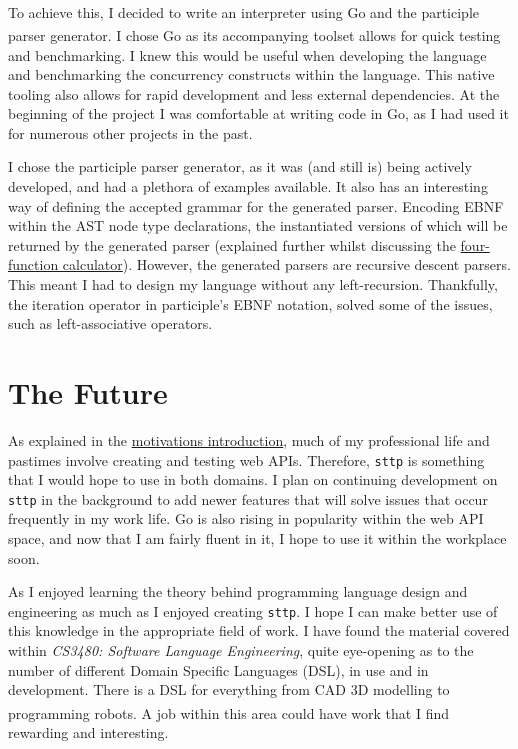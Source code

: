 \documentclass[]{full}
\theoremstyle{definition}
\begin{document}
To achieve this, I decided to write an interpreter using Go\textsuperscript{\cite{the_go_programming_language}} and the participle parser generator\textsuperscript{\cite{thomas_2021}}. I chose Go as its accompanying toolset allows for quick testing and benchmarking. I knew this would be useful when developing the language and benchmarking the concurrency constructs within the language. This native tooling also allows for rapid development and less external dependencies. At the beginning of the project I was comfortable at writing code in Go, as I had used it for numerous other projects in the past.

I chose the participle parser generator, as it was (and still is) being actively developed, and had a plethora of examples available. It also has an interesting way of defining the accepted grammar for the generated parser. Encoding EBNF within the AST node type declarations, the instantiated versions of which will be returned by the generated parser (explained further whilst discussing the \hyperref[sec:four-function-calc]{four-function calculator}). However, the generated parsers are recursive descent parsers. This meant I had to design my language without any left-recursion. Thankfully, the iteration operator in participle's EBNF notation, solved some of the issues, such as left-associative operators.

\section{The Future}

As explained in the \hyperref[chap:motivations]{motivations introduction}, much of my professional life and pastimes involve creating and testing web APIs. Therefore, \verb|sttp| is something that I would hope to use in both domains. I plan on continuing development on \verb|sttp| in the background to add newer features that will solve issues that occur frequently in my work life. Go is also rising in popularity within the web API space, and now that I am fairly fluent in it, I hope to use it within the workplace soon.

As I enjoyed learning the theory behind programming language design and engineering as much as I enjoyed creating \verb|sttp|. I hope I can make better use of this knowledge in the appropriate field of work. I have found the material covered within \textit{CS3480: Software Language Engineering}, quite eye-opening as to the number of different Domain Specific Languages (DSL), in use and in development. There is a DSL for everything from CAD 3D modelling to programming robots\textsuperscript{\cite{nordmann_hochgeschwender_wrede_2014}}. A job within this area could have work that I find rewarding and interesting.
\end{document}
